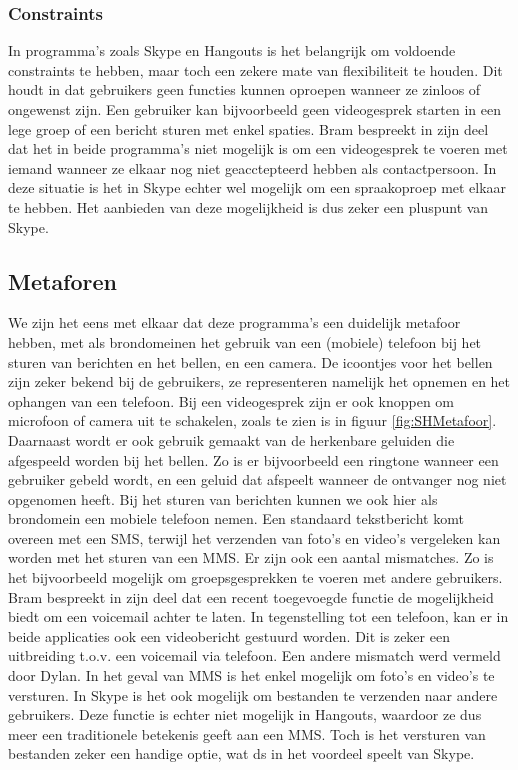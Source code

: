 \documentclass[11pt]{article}
\begin{document}
\subsubsection{Constraints}
In programma's zoals Skype en Hangouts is het belangrijk om voldoende constraints te hebben, maar toch een zekere mate van flexibiliteit te houden. Dit houdt in dat gebruikers geen functies kunnen oproepen wanneer ze zinloos of ongewenst zijn. Een gebruiker kan bijvoorbeeld geen videogesprek starten in een lege groep of een bericht sturen met enkel spaties.
\newline
Bram bespreekt in zijn deel dat het in beide programma's niet mogelijk is om een videogesprek te voeren met iemand wanneer ze elkaar nog niet geacctepteerd hebben als contactpersoon. In deze situatie is het in Skype echter wel mogelijk om een spraakoproep met elkaar te hebben. Het aanbieden van deze mogelijkheid is dus zeker een pluspunt van Skype.
\subsection{Metaforen}
We zijn het eens met elkaar dat deze programma's een duidelijk metafoor hebben, met als brondomeinen het gebruik van een (mobiele) telefoon bij het sturen van berichten en het bellen, en een camera. De icoontjes voor het bellen zijn zeker bekend bij de gebruikers, ze representeren namelijk het opnemen en het ophangen van een telefoon. Bij een videogesprek zijn er ook knoppen om microfoon of camera uit te schakelen, zoals te zien is in figuur \ref{fig:SHMetafoor}. Daarnaast wordt er ook gebruik gemaakt van de herkenbare geluiden die afgespeeld worden bij het bellen. Zo is er bijvoorbeeld een ringtone wanneer een gebruiker gebeld wordt, en een geluid dat afspeelt wanneer de ontvanger nog niet opgenomen heeft. 
\newline
Bij het sturen van berichten kunnen we ook hier als brondomein een mobiele telefoon nemen. Een standaard tekstbericht komt overeen met een SMS, terwijl het verzenden van foto's en video's vergeleken kan worden met het sturen van een MMS.
\newline
Er zijn ook een aantal mismatches. Zo is het bijvoorbeeld mogelijk om groepsgesprekken te voeren met andere gebruikers. Bram bespreekt in zijn deel dat een recent toegevoegde functie de mogelijkheid biedt om een voicemail achter te laten. In tegenstelling tot een telefoon, kan er in beide applicaties ook een videobericht gestuurd worden. Dit is zeker een uitbreiding t.o.v. een voicemail via telefoon.
\newline
Een andere mismatch werd vermeld door Dylan. In het geval van MMS is het enkel mogelijk om foto's en video's te versturen. In Skype is het ook mogelijk om bestanden te verzenden naar andere gebruikers. Deze functie is echter niet mogelijk in Hangouts, waardoor ze dus meer een traditionele betekenis geeft aan een MMS. Toch is het versturen van bestanden zeker een handige optie, wat ds in het voordeel speelt van Skype. 
\newpage
\end{document}

